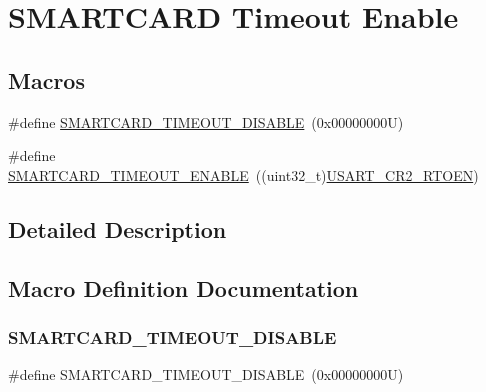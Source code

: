 \hypertarget{group___s_m_a_r_t_c_a_r_d___timeout___enable}{}\section{S\+M\+A\+R\+T\+C\+A\+RD Timeout Enable}
\label{group___s_m_a_r_t_c_a_r_d___timeout___enable}
\subsection*{Macros}
\begin{DoxyCompactItemize}
\item 
\#define \hyperlink{group___s_m_a_r_t_c_a_r_d___timeout___enable_ga0ba20486fc3bcc8e5af29c93a6a8cf59}{S\+M\+A\+R\+T\+C\+A\+R\+D\+\_\+\+T\+I\+M\+E\+O\+U\+T\+\_\+\+D\+I\+S\+A\+B\+LE}~(0x00000000\+U)
\item 
\#define \hyperlink{group___s_m_a_r_t_c_a_r_d___timeout___enable_gafe265eb057a328f79f45394e1d5f6655}{S\+M\+A\+R\+T\+C\+A\+R\+D\+\_\+\+T\+I\+M\+E\+O\+U\+T\+\_\+\+E\+N\+A\+B\+LE}~((uint32\+\_\+t)\hyperlink{group___peripheral___registers___bits___definition_gab89524eda63950f55bc47208a66b7dca}{U\+S\+A\+R\+T\+\_\+\+C\+R2\+\_\+\+R\+T\+O\+EN})
\end{DoxyCompactItemize}


\subsection{Detailed Description}


\subsection{Macro Definition Documentation}
\mbox{\label{group___s_m_a_r_t_c_a_r_d___timeout___enable_ga0ba20486fc3bcc8e5af29c93a6a8cf59}} 
\subsubsection{\texorpdfstring{S\+M\+A\+R\+T\+C\+A\+R\+D\+\_\+\+T\+I\+M\+E\+O\+U\+T\+\_\+\+D\+I\+S\+A\+B\+LE}{SMARTCARD\_TIMEOUT\_DISABLE}}
{\footnotesize\ttfamily \#define S\+M\+A\+R\+T\+C\+A\+R\+D\+\_\+\+T\+I\+M\+E\+O\+U\+T\+\_\+\+D\+I\+S\+A\+B\+LE~(0x00000000\+U)}

